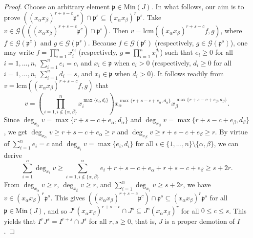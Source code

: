 \documentclass[11pt]{amsart}
\begin{document}
\begin{proof}
  Choose an arbitrary element   $\mathfrak{p}\in \mathrm{Min}(J)$. In what follows, our aim is to prove 
  $((x_\alpha x_\beta)^{r+s-c} \mathfrak{p}^{c}) \cap    \mathfrak{p}^{s} \subseteq (x_\alpha x_\beta)^{r}  \mathfrak{p}^{s}$. 
     Take  $v\in \mathcal{G}(((x_\alpha x_\beta)^{r+s-c}  \mathfrak{p}^{c}) \cap    \mathfrak{p}^{s})$. Then 
    $v=\mathrm{lcm}((x_\alpha x_\beta)^{r+s-c}f,g)$, 
    where $f\in \mathcal{G}({\mathfrak{p}}^{c})$ and $g\in  \mathcal{G}({\mathfrak{p}}^{s})$.  Because   $f\in \mathcal{G}({\mathfrak{p}}^{c})$ (respectively, $g\in  \mathcal{G}({\mathfrak{p}}^{s})$), one may  write $f=\prod_{i=1}^nx^{e_i}_i$ 
    (respectively,   $g=\prod_{i=1}^nx^{d_i}_i$) such that  $e_i\geq 0$ for all $i=1, \ldots, n$, $\sum_{i=1}^n e_i=c$, and $x_i\in \mathfrak{p}$ when 
    $e_i>0$     (respectively, $d_i\geq 0$ for all $i=1, \ldots, n$, $\sum_{i=1}^n d_i=s$, and $x_i\in \mathfrak{p}$ when $d_i>0$). 
        It follows  readily   from  $v=\mathrm{lcm}((x_\alpha x_\beta)^{r+s-c}f,g)$ that     
  $$v=\left(\prod_{i=1, i\notin\{\alpha, \beta\}}^{n} x_{i}^{\max\{e_i,d_i\}}\right) x_{\alpha}^{\max\{r+s-c + e_\alpha, d_\alpha\}}  
   x_{\beta}^{\max\{r+s-c + e_\beta,d_\beta\}}.$$
   Since $\deg_{x_{\alpha}} v= \max\{r+s-c + e_\alpha, d_\alpha\}$ and $\deg_{x_{\beta}} v=\max\{r+s-c + e_\beta, d_\beta\}$, we get  
      $\deg_{x_{\alpha}} v \geq r+s-c +e_\alpha \geq r$ and $\deg_{x_{\beta}} v \geq r+s-c + e_\beta \geq r$. By virtue of 
   $\sum_{i=1}^n e_i=c$ and $\deg_{x_i} v =\max\{e_i, d_i\}$ for all $i\in \{1, \ldots, n\}\setminus \{\alpha, \beta\}$, we can derive    
   $$\sum_{i=1}^n\deg_{x_i} v \geq \sum_{i=1, i\notin\{\alpha, \beta\}}^ne_i +r+s-c +e_\alpha + r+s-c+e_\beta \geq s+2r.$$
   From   $\deg_{x_{\alpha}} v \geq r$, $\deg_{x_{\beta}} v \geq  r$, and $\sum_{i=1}^n\deg_{x_i} v \geq s+2r$, we have  
   $v\in (x_\alpha x_\beta)^{r}  \mathfrak{p}^{s}$. This gives   $((x_\alpha x_\beta)^{r+s-c} \mathfrak{p}^{c}) \cap    \mathfrak{p}^{s} \subseteq (x_\alpha x_\beta)^{r}  \mathfrak{p}^{s}$  for all   $\mathfrak{p}\in \mathrm{Min}(J)$,  and so  $J^{c}(x_\alpha x_\beta)^{r+s-c} \cap J^s \subseteq J^s(x_\alpha x_\beta)^{r}$
  for all $0\leq c \leq s$. This yields that     $I^rJ^s=I^{r+s} \cap J^s$ for all $r,s \geq 0$, that is, $J$ is a proper demotion of $I$. 
 

\end{proof}
\end{document}
